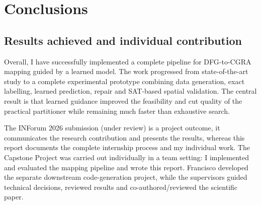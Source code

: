 %
%
%

\section{Conclusions}

\subsection{Results achieved and individual contribution}

Overall, I have successfully implemented a complete pipeline for DFG-to-CGRA mapping guided by a learned model. The work progressed from state-of-the-art study to a complete experimental prototype combining data generation, exact labelling, learned prediction, repair and SAT-based spatial validation. The central result is that learned guidance improved the feasibility and cut quality of the practical partitioner while remaining much faster than exhaustive search.

The INForum 2026 submission (under review) is a project outcome, it communicates the research contribution and presents the results, whereas this report documents the complete internship process and my individual work. The Capstone Project was carried out individually in a team setting: I implemented and evaluated the mapping pipeline and wrote this report. Francisco developed the separate downstream code-generation project, while the supervisors guided technical decisions, reviewed results and co-authored/reviewed the scientific paper.

